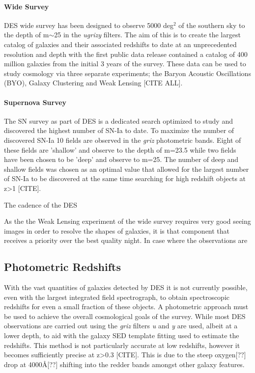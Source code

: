 \paragraph{Wide Survey}
DES wide survey has been designed to observe 5000 deg$^2$ of the southern sky to the depth of m$\sim$25 in the \textit{ugrizy} filters. The aim of this is to create the largest catalog of galaxies and their associated redshifts to date at an unprecedented resolution and depth with the first public data release contained a catalog of 400 million galaxies from the initial 3 years of the survey. These data can be used to study cosmology via three separate experiments; the Baryon Acoustic Oscillations (BYO), Galaxy Clustering and Weak Lensing [CITE ALL]. 

\paragraph{Supernova Survey}
The SN survey as part of DES is a dedicated search optimized to study and discovered the highest number of SN-Ia to date. To maximize the number of discovered SN-Ia 10 fields are observed in the \textit{griz} photometric bands. Eight of these fields are 'shallow' and observe to the depth of m=23.5 while two fields have been chosen to be 'deep' and observe to m=25. The number of deep and shallow fields was chosen as an optimal value that allowed for the largest number of SN-Ia to be discovered at the same time searching for high redshift objects at z>1 [CITE].

The cadence of the DES 

As the the Weak Lensing experiment of the wide survey requires very good seeing images in order to resolve the shapes of galaxies, it is that component that receives a priority over the best quality night. In case where the observations are 

\subsection{Photometric Redshifts}
With the vast quantities of galaxies detected by DES it is not currently possible, even with the largest integrated field spectrograph, to obtain spectroscopic redshifts for even a small fraction of these objects. A photometric approach must be used to achieve the overall cosmological goals of the survey. While most DES observations are carried out using the \textit{griz} filters \textit{u} and \textit{y} are used, albeit at a lower depth, to aid with the galaxy SED template fitting used to estimate the redshifts. This method is not particularly accurate at low redshifts, however it becomes sufficiently precise at z>0.3 [CITE]. This is due to the steep oxygen[??] drop at 4000\AA [??] shifting into the redder bands amongst other galaxy features. 


